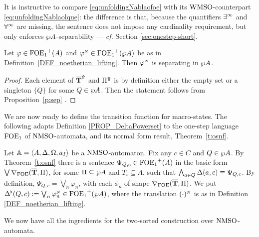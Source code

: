 It is instructive to compare \eqref{eq:unfoldingNablaofoe} with its
$\mathrm{WMSO}$-counterpart \eqref{eq:unfoldingNablaolque}: the difference is that,
because the quantifiers $\exists^\infty$ and $\forall^\infty$ are missing, the sentence does not
impose any cardinality requirement, but only enforces $\wp A$-separability --- 
\emph{cf.} Section \ref{sec:onestep-short}.

\begin{lemma}\label{lemma:automatafunctionalsentence}
Let $\varphi \in {\ensuremath{\mathrm{FOE}_1}}^+(A)$ and $\varphi^{{\scriptscriptstyle N}}\in {\ensuremath{\mathrm{FOE}_1}}^+(\wp A )$ be as
in Definition~\ref{DEF_noetherian_lifting}. 
Then $\varphi^{{\scriptscriptstyle N}}$ is separating in $\wp A$.
\end{lemma}

\begin{proof}
Each element of $\overline{{\mathbf{T}}}^{\Uparrow}$ and $\Pi^{\Uparrow}$ is by definition either the
empty set or a singleton $\{Q\}$ for some $Q \in \wp A$. 
Then the statement follows from Proposition~\ref{p:sep} .
\end{proof}

We are now ready to define the transition function for macro-states. 
The following adapts Definition \ref{PROP_DeltaPowerset} to the one-step
language $\mathrm{FOE}_1$ of $\mathrm{NMSO}$-automata, and its normal form result, 
Theorem~\ref{t:osnf}. 
\begin{definition}\label{PROP_DeltaPowerset_noet}
Let $\mathbb{A} = \langle{A,\Delta,\Omega,a_I}\rangle$ be a $\mathrm{NMSO}$-automaton. 
Fix any $c \in C$ and $Q \in \wp A$. 
By Theorem~\ref{t:osnf} there is a sentence $\Psi_{Q,c} \in
{\ensuremath{\mathrm{FOE}_1}}^+(A)$ in the basic form $\bigvee \nabla_{\mathrm{FOE}}(\overline{{\mathbf{T}}},\Pi)$, for some
$\Pi \subseteq \wp A$ and $T_i \subseteq A$, such that $\bigwedge_{a \in Q} 
\Delta(a,c) \equiv \Psi_{Q,c}$.
By definition, $\Psi_{Q,c} = \bigvee_{n}\varphi_n$, with each $\phi_{n}$ of 
shape $\nabla_{\mathrm{FOE}}(\overline{{\mathbf{T}}},\Pi)$.
%
We put $\Delta^{\flat}(Q,c) \mathrel{:=}  \bigvee_{n}\varphi_n^{{\scriptscriptstyle N}}  \in {\ensuremath{\mathrm{FOE}_1}}^+(\wp A)$, where the translation $(\cdot)^{{\scriptscriptstyle N}}$ is as in Definition \ref{DEF_noetherian_lifting}.
\end{definition}

\noindent
We now have all the ingredients for the two-sorted construction over
$\mathrm{NMSO}$-automata.

